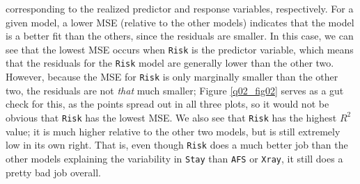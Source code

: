 \documentclass[10pt]{article}
\begin{document}
\begin{itemize}
    corresponding 
    to the realized predictor and response variables, respectively. For a given model, a lower MSE (relative to the other models) indicates that the model is 
    a better fit than the others, since the residuals are smaller. In this case, we can see that the lowest MSE occurs when \texttt{Risk} is the predictor
    variable, which means that the residuals for the \texttt{Risk} model are generally lower than the other two. However, because the MSE for \texttt{Risk}
    is only marginally smaller than the other two, the residuals are not \textit{that} much smaller; Figure \ref{q02_fig02} serves as a gut check for this, 
    as the points spread out in all three plots, so it would not be obvious that \texttt{Risk} has the lowest MSE. We also see that \texttt{Risk} has the 
    highest \(R^2\) value; it is much higher relative to the other two models, but is still extremely low in its own right. That is, even though 
    \texttt{Risk} does a much better job than the other models explaining the variability in \texttt{Stay} than \texttt{AFS} or \texttt{Xray}, it still does 
    a pretty bad job overall. 
\end{itemize}

\end{document}
